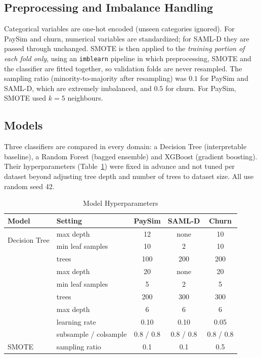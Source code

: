 \documentclass[10pt,twocolumn,a4paper]{article}
\begin{document}
\subsection{Preprocessing and Imbalance Handling}
Categorical variables are one-hot encoded (unseen categories ignored). For PaySim and churn, numerical variables are standardized; for SAML-D they are passed through unchanged. SMOTE is then applied to the \emph{training portion of each fold only}, using an \texttt{imblearn} pipeline in which preprocessing, SMOTE and the classifier are fitted together, so validation folds are never resampled. The sampling ratio (minority-to-majority after resampling) was $0.1$ for PaySim and SAML-D, which are extremely imbalanced, and $0.5$ for churn. For PaySim, SMOTE used $k=5$ neighbours.

\subsection{Models}
Three classifiers are compared in every domain: a Decision Tree (interpretable baseline), a Random Forest (bagged ensemble) and XGBoost (gradient boosting). Their hyperparameters (Table~\ref{tab:hparams}) were fixed in advance and not tuned per dataset beyond adjusting tree depth and number of trees to dataset size. All use random seed 42.

\begin{table}[t]
\centering
\caption{Model Hyperparameters}
\label{tab:hparams}
\footnotesize
\setlength{\tabcolsep}{2.6pt}
\begin{tabular}{@{}llccc@{}}
\toprule
\textbf{Model} & \textbf{Setting} & \textbf{PaySim} & \textbf{SAML-D} & \textbf{Churn}\\
\midrule
\multirow{2}{*}{Decision Tree} & max depth & 12 & none & 10\\
 & min leaf samples & 10 & 2 & 10\\
\addlinespace
\multirow{3}{*}{Random Forest} & trees & 100 & 200 & 200\\
 & max depth & 20 & none & 20\\
 & min leaf samples & 5 & 2 & 5\\
\addlinespace
\multirow{4}{*}{XGBoost} & trees & 200 & 300 & 300\\
 & max depth & 6 & 6 & 6\\
 & learning rate & 0.10 & 0.10 & 0.05\\
 & subsample / colsample & 0.8 / 0.8 & 0.8 / 0.8 & 0.8 / 0.8\\
\midrule
SMOTE & sampling ratio & 0.1 & 0.1 & 0.5\\
\bottomrule
\end{tabular}
\end{table}
\end{document}
